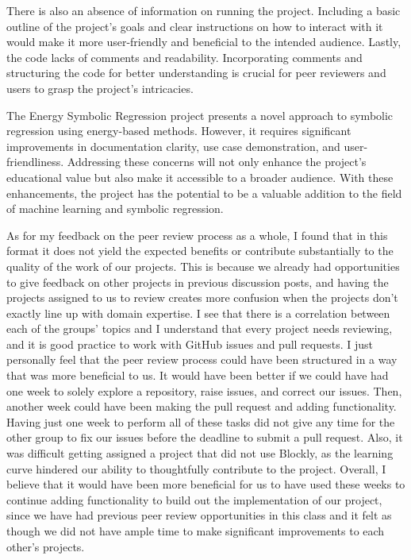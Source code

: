 \documentclass{article}
\theoremstyle{theorem}
\theoremstyle{definition}
\theoremstyle{remark}
\begin{document}
There is also an absence of information on running the project. Including a basic outline of the project's goals and clear instructions on how to interact with it would make it more user-friendly and beneficial to the intended audience. Lastly, the code lacks of comments and readability. Incorporating comments and structuring the code for better understanding is crucial for peer reviewers and users to grasp the project's intricacies.

The Energy Symbolic Regression project presents a novel approach to symbolic regression using energy-based methods. However, it requires significant improvements in documentation clarity, use case demonstration, and user-friendliness. Addressing these concerns will not only enhance the project's educational value but also make it accessible to a broader audience. With these enhancements, the project has the potential to be a valuable addition to the field of machine learning and symbolic regression.

As for my feedback on the peer review process as a whole, I found that in this format it does not yield the expected benefits or contribute substantially to the quality of the work of our projects. This is because we already had opportunities to give feedback on other projects in previous discussion posts, and having the projects assigned to us to review creates more confusion when the projects don't exactly line up with domain expertise. I see that there is a correlation between each of the groups' topics and I understand that every project needs reviewing, and it is good practice to work with GitHub issues and pull requests. I just personally feel that the peer review process could have been structured in a way that was more beneficial to us. It would have been better if we could have had one week to solely explore a repository, raise issues, and correct our issues. Then, another week could have been making the pull request and adding functionality. Having just one week to perform all of these tasks did not give any time for the other group to fix our issues before the deadline to submit a pull request. Also, it was difficult getting assigned a project that did not use Blockly, as the learning curve hindered our ability to thoughtfully contribute to the project. Overall, I believe that it would have been more beneficial for us to have used these weeks to continue adding functionality to build out the implementation of our project, since we have had previous peer review opportunities in this class and it felt as though we did not have ample time to make significant improvements to each other's projects. 
\end{document}
